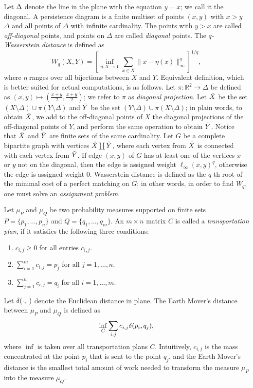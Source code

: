 \documentclass[]{ws-ijcga}
\renewcommand{\geq}{\geqslant}
\newcommand{\RR}{\mathbb{R}}
\newcommand{\wsdist}[1]{{W_{#1}}}
\begin{document}
Let ${\Delta}$ denote the line in the plane with the equation $y = x$; we call it the diagonal.
A persistence diagram is a finite multiset of points $(x, y)$ with $x > y$
$\Delta$ and all points of $\Delta$ with infinite cardinality.
The points with $y > x$ are called \textit{off-diagonal} points,
and points on $\Delta$ are called \textit{diagonal} points.
The \emph{$q$-Wasserstein distance} is defined as
\[
    \wsdist{q}(X,Y) = \left[ \inf_{\eta:X\rightarrow Y} \sum_{x\in X} \|x-\eta(x)\|_\infty^q\right]^{1/q},
\]
where $\eta$ ranges over all bijections between $X$ and $Y$.
Equivalent definition, which is better suited for actual computations,
is as follows. Let $\pi\colon \RR^2 \to \Delta$ be defined
as $(x,y) \mapsto (\frac{x+y}{2}, \frac{x+y}{2})$; we refer to $\pi$ as \textit{diagonal
projection}. Let ${\tilde{X}}$ be the set $(X\setminus \Delta) \cup \pi(Y \setminus \Delta)$
and ${\tilde{Y}}$ be the set $(Y\setminus \Delta) \cup \pi(X \setminus \Delta)$; in plain words,
to obtain ${\tilde{X}}$, we add to the off-diagonal points of $X$
the diagonal projections of the off-diagonal points of $Y$,
and perform the same operation to obtain ${\tilde{Y}}$. Notice that ${\tilde{X}}$ and ${\tilde{Y}}$
are finite sets of the same cardinality. Let $G$ be a complete bipartite
graph with vertices ${\tilde{X}} \coprod {\tilde{Y}}$, where each vertex from ${\tilde{X}}$
is connected with each vertex from ${\tilde{Y}}$. If edge $(x,y)$ of $G$
has at least one of the vertices $x$ or $y$ not on the diagonal,
then the edge is assigned weight $\ell_{\infty}(x, y)^q$, otherwise
the edge is assigned weight 0. Wasserstein distance is defined as the $q$-th
root of the minimal cost of a perfect matching on $G$; in other words,
in order to find $\wsdist{q}$, one must solve an \textit{assignment problem}.


Let $\mu_P$ and $\mu_Q$
be two probability measures supported
on finite sets $P = \{p_1, \dots, p_n \}$
and $Q = \{ q_1, \dots, q_m \}$.
An $m \times n$ matrix $C$
is called a \textit{transportation plan},
if it satisfies the following three conditions:
\begin{enumerate}
    \item $c_{i,j} \geq 0$ for all entries $c_{i, j}$.
    \item $\sum_{i = 1}^m c_{i, j} = p_j$ for all $j = 1, \dots, n$.
    \item $\sum_{j = 1}^n c_{i, j} = q_i$ for all $i = 1, \dots, m$.
\end{enumerate}
Let $\delta(\cdot, \cdot)$ denote the Euclidean
distance in plane.
The Earth Mover's distance between $\mu_P$ and $\mu_Q$
is defined as
\[
    \inf_C \sum_{i, j} c_{i, j} \delta(p_i, q_j),
\]
where $\inf$ is taken over all transportation
plans $C$. Intuitively, $c_{i,j}$ is the
mass concentrated at the point $p_i$ that
is sent to the point $q_j$, and the Earth Mover's
distance is the smallest total amount of work
needed to transform the measure $\mu_P$
into the measure $\mu_Q$.
\end{document}
